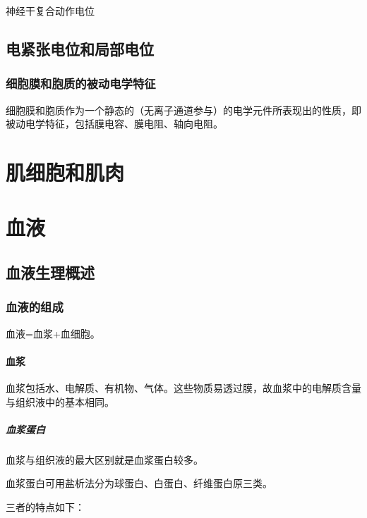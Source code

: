 神经干复合动作电位

\subsection{电紧张电位和局部电位}

\subsubsection{细胞膜和胞质的被动电学特征}

细胞膜和胞质作为一个静态的（无离子通道参与）的电学元件所表现出的性质，即被动电学特征，包括膜电容、膜电阻、轴向电阻。





\section{肌细胞和肌肉}












\section{血液}

\subsection{血液生理概述}

\subsubsection{血液的组成}

血液=血浆+血细胞。

\paragraph{血浆}

血浆包括水、电解质、有机物、气体。这些物质易透过膜，故血浆中的电解质含量与组织液中的基本相同。

\subparagraph{血浆蛋白}

血浆与组织液的最大区别就是血浆蛋白较多。

血浆蛋白可用盐析法分为球蛋白、白蛋白、纤维蛋白原三类。

三者的特点如下：

